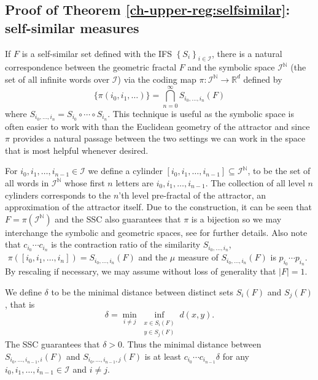\subsection{Proof of Theorem \ref{ch-upper-reg:selfsimilar}: self-similar measures} \label{ch-upper-reg:self-similar}


If $F$ is a self-similar set defined with the IFS $\left\{S_i \right\}_{i\in \mathcal{I}}$, there is a natural correspondence between the geometric fractal $F$ and the symbolic space $\mathcal{I}^{\mathbb{N}}$ (the set of all infinite words over $\mathcal{I}$) via the coding map $\pi \colon \mathcal{I}^{\mathbb{N}} \rightarrow \mathbb{R}^d$ defined by 
\[
\{\pi(i_0,i_1,\ldots) \} =  \bigcap_{n=0}^\infty S_{i_0,\ldots, i_n}(F)
\]
where $S_{i_0,\ldots, i_n} = S_{i_0} \circ \cdots \circ S_{ i_n}$. This technique is useful as the symbolic space is often easier to work with than the Euclidean geometry of the attractor and since $\pi$ provides a natural passage between the two settings we can work in the space that is most helpful whenever desired. 

For $ i_0,i_1,\ldots, i_{n-1} \in \mathcal{I}$ we define a cylinder $[i_0,i_1,\ldots, i_{n-1}] \subseteq \mathcal{I}^\mathbb{N}$, to be the set of all words in $\mathcal{I}^{\mathbb{N}}$ whose first $n$ letters are $i_0,i_1,\ldots, i_{n-1}$. The collection of all level $n$ cylinders corresponds to the  $n$'th level  pre-fractal of the attractor, an approximation of the attractor itself.  Due to the construction, it can be seen that $F= \pi(\mathcal{I}^\mathbb{N})$ and the SSC also guarantees that $\pi$ is a bijection so we may interchange the symbolic and geometric spaces, see \cite{falconer} for further details.  Also note that  $c_{i_0}\cdots c_{i_{n}}$ is the contraction ratio of the similarity $S_{i_0,\ldots, i_n} $,   $\,\,\pi([i_0,i_1,\ldots, i_{n}] ) = S_{i_0,\ldots, i_n} (F)$ and the $\mu$ measure of $S_{i_0,\ldots, i_n} (F)$  is $p_{i_0}\cdots p_{i_{n}}$.  By rescaling if necessary, we may assume without loss of generality that $\lvert F \rvert=1$. 


We define $\delta$ to be the minimal distance between distinct  sets $S_i(F)$ and $S_j(F)$, that is 
\[
\delta= \min_{i\neq j} \inf_{\substack{x \in S_i(F) \\ y \in S_j(F)}} d(x,y).
\]
The SSC guarantees that $\delta > 0$. Thus the minimal distance between $S_{i_0,\ldots,i_{n-1},i}(F)$ and $S_{i_0,\ldots,i_{n-1},j}(F)$ is at least $c_{i_0}\cdots c_{i_{n-1}} \delta$ for any   $ i_0,i_1,\ldots, i_{n-1} \in \mathcal{I}$ and $i\neq j$.


